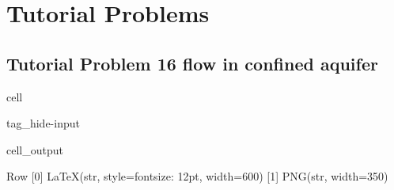 \documentclass[letterpaper,10pt,english]{jupyterBook}
\begin{document}
\section{Tutorial Problems}
\label{\detokenize{content/tutorials/T6/tutorial_06:tutorial-problems}}

\subsection{Tutorial Problem 16\sphinxhyphen{} flow in confined aquifer}
\label{\detokenize{content/tutorials/T6/tutorial_06:tutorial-problem-16-flow-in-confined-aquifer}}
\begin{sphinxuseclass}{cell}
\begin{sphinxuseclass}{tag_hide-input}\begin{sphinxVerbatimOutput}

\begin{sphinxuseclass}{cell_output}
\begin{sphinxVerbatim}[commandchars=\\\{\}]
Row
    [0] LaTeX(str, style=\PYGZob{}\PYGZsq{}font\PYGZhy{}size\PYGZsq{}: \PYGZsq{}12pt\PYGZsq{}\PYGZcb{}, width=600)
    [1] PNG(str, width=350)
\end{sphinxVerbatim}

\end{sphinxuseclass}\end{sphinxVerbatimOutput}

\end{sphinxuseclass}
\end{sphinxuseclass}
\end{document}
